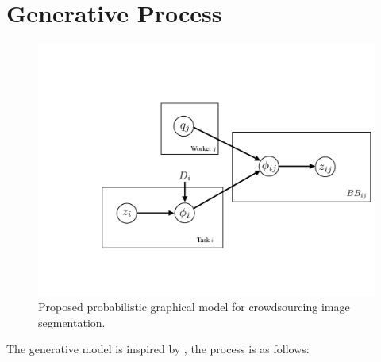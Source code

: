 \documentclass[12pt]{article}
\begin{document}
\section{Generative Process}
\begin{figure}[ht]
\centering
\includegraphics[trim=1cm 5cm 1cm 5cm,width=0.8\linewidth]{generative_pgm.pdf}
\caption{Proposed probabilistic graphical model for crowdsourcing image segmentation.}
\end{figure}
The generative model is inspired by \cite{Welinder2010}, the process is as follows:
\end{document}

